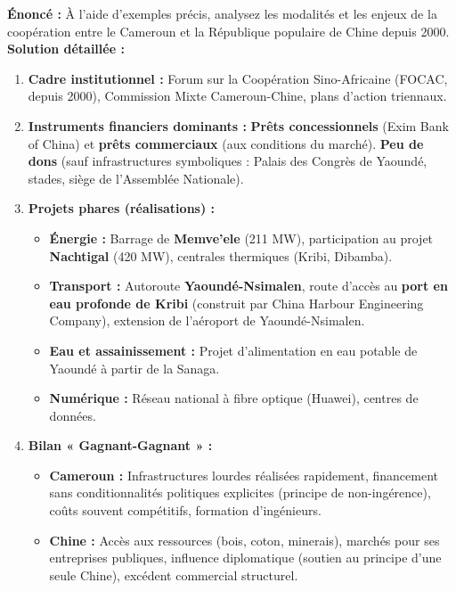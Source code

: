 \documentclass[11pt]{article}
\begin{document}
\begin{exoresolu}
    \textbf{Énoncé :} À l'aide d'exemples précis, analysez les modalités et les enjeux de la coopération entre le Cameroun et la République populaire de Chine depuis 2000.
    \tcblower
    \textbf{Solution détaillée :}
    \begin{enumerate}
        \item \textbf{Cadre institutionnel :} Forum sur la Coopération Sino-Africaine (FOCAC, depuis 2000), Commission Mixte Cameroun-Chine, plans d'action triennaux.
        \item \textbf{Instruments financiers dominants :} \textbf{Prêts concessionnels} (Exim Bank of China) et \textbf{prêts commerciaux} (aux conditions du marché). \textbf{Peu de dons} (sauf infrastructures symboliques : Palais des Congrès de Yaoundé, stades, siège de l'Assemblée Nationale).
        \item \textbf{Projets phares (réalisations) :}
            \begin{itemize}
                \item \textbf{Énergie :} Barrage de \textbf{Memve'ele} (211 MW), participation au projet \textbf{Nachtigal} (420 MW), centrales thermiques (Kribi, Dibamba).
                \item \textbf{Transport :} Autoroute \textbf{Yaoundé-Nsimalen}, route d'accès au \textbf{port en eau profonde de Kribi} (construit par China Harbour Engineering Company), extension de l'aéroport de Yaoundé-Nsimalen.
                \item \textbf{Eau et assainissement :} Projet d'alimentation en eau potable de Yaoundé à partir de la Sanaga.
                \item \textbf{Numérique :} Réseau national à fibre optique (Huawei), centres de données.
            \end{itemize}
        \item \textbf{Bilan « Gagnant-Gagnant » :}
            \begin{itemize}
                \item \textbf{Cameroun :} Infrastructures lourdes réalisées rapidement, financement sans conditionnalités politiques explicites (principe de non-ingérence), coûts souvent compétitifs, formation d'ingénieurs.
                \item \textbf{Chine :} Accès aux ressources (bois, coton, minerais), marchés pour ses entreprises publiques, influence diplomatique (soutien au principe d'une seule Chine), excédent commercial structurel.

\end{itemize}
\end{enumerate}
\end{exoresolu}
\end{document}
